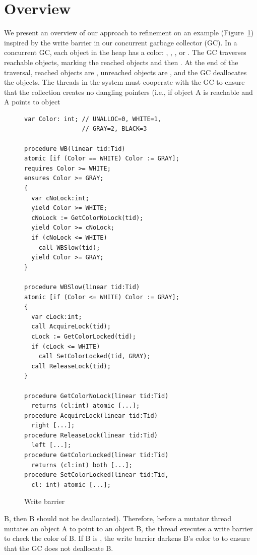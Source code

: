 \section{Overview}
\label{sec:overview}

We present an overview of our approach to refinement on an example (Figure~\ref{fig:reft})
inspired by the write barrier in our concurrent garbage collector (GC).
In a concurrent GC, each object in the heap has a color: , , , or .
The GC traverses reachable objects, marking the reached objects  and then .
At the end of the traversal, reached objects are , unreached objects are ,
and the GC deallocates the  objects.
The threads in the system must cooperate with the GC to ensure that the collection creates no dangling pointers
(i.e., if object A is reachable and A points to object
\begin{figure}
\vspace*{-1cm}
{\scriptsize
\begin{verbatim}
var Color: int; // UNALLOC=0, WHITE=1,
                // GRAY=2, BLACK=3

procedure WB(linear tid:Tid)
atomic [if (Color == WHITE) Color := GRAY];
requires Color >= WHITE;
ensures Color >= GRAY;
{
  var cNoLock:int;
  yield Color >= WHITE;
  cNoLock := GetColorNoLock(tid);
  yield Color >= cNoLock;
  if (cNoLock <= WHITE) 
    call WBSlow(tid);
  yield Color >= GRAY;
}

procedure WBSlow(linear tid:Tid)
atomic [if (Color <= WHITE) Color := GRAY];
{
  var cLock:int;
  call AcquireLock(tid);
  cLock := GetColorLocked(tid);
  if (cLock <= WHITE) 
    call SetColorLocked(tid, GRAY);
  call ReleaseLock(tid);
}

procedure GetColorNoLock(linear tid:Tid) 
  returns (cl:int) atomic [...];
procedure AcquireLock(linear tid:Tid) 
  right [...];
procedure ReleaseLock(linear tid:Tid) 
  left [...];
procedure GetColorLocked(linear tid:Tid) 
  returns (cl:int) both [...];
procedure SetColorLocked(linear tid:Tid, 
  cl: int) atomic [...];
\end{verbatim}
}
\vspace*{-0.3cm}
\caption{Write barrier}
\label{fig:reft}
\end{figure}
B, then B should not be deallocated).
Therefore, before a mutator thread mutates an object A to point to an object B, the thread executes a write barrier to check the color of B.
If B is , the write barrier darkens B's color to  to ensure that the GC does not deallocate B.
